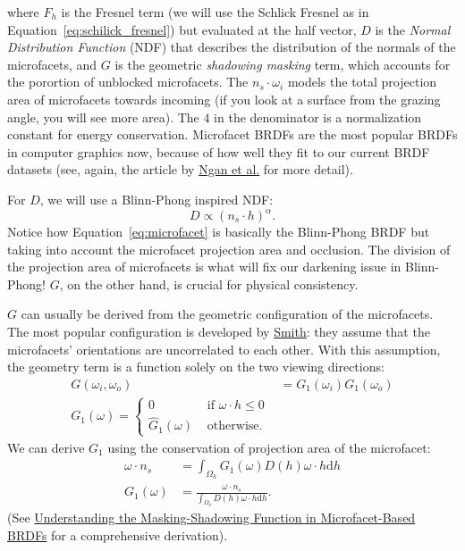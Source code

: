where $F_h$ is the Fresnel term (we will use the Schlick Fresnel as in Equation~\eqref{eq:schilick_fresnel}) but evaluated at the half vector, $D$ is the \emph{Normal Distribution Function} (NDF) that describes the distribution of the normals of the microfacets, and $G$ is the geometric \emph{shadowing masking} term, which accounts for the porortion of unblocked microfacets. The $n_s \cdot \omega_i$ models the total projection area of microfacets towards incoming (if you look at a surface from the grazing angle, you will see more area). The $4$ in the denominator is a normalization constant for energy conservation.
Microfacet BRDFs are the most popular BRDFs in computer graphics now, because of how well they fit to our current BRDF datasets (see, again, the article by \href{http://people.csail.mit.edu/addy/research/brdf/index.html}{Ngan et al.} for more detail).

For $D$, we will use a Blinn-Phong inspired NDF:
\begin{equation}
D \propto \left(n_s \cdot h\right)^{\alpha}.
\label{eq:blinn_NDF}
\end{equation}
Notice how Equation~\eqref{eq:microfacet} is basically the Blinn-Phong BRDF but taking into account the microfacet projection area and occlusion.
The division of the projection area of microfacets is what will fix our darkening issue in Blinn-Phong!
$G$, on the other hand, is crucial for physical consistency.

$G$ can usually be derived from the geometric configuration of the microfacets. The most popular configuration is developed by \href{https://ieeexplore.ieee.org/document/1138991}{Smith}: they assume that the microfacets' orientations are uncorrelated to each other. With this assumption, the geometry term is a function solely on the two viewing directions: 
\begin{equation}
\begin{aligned}
G(\omega_i, \omega_o) &= G_1(\omega_i) G_1(\omega_o) \\
G_1(\omega) = \begin{cases}
0 & \text{ if } \omega \cdot h \leq 0 \\
\hat{G}_1(\omega) & \text{ otherwise.}
\end{cases}
\end{aligned}
\end{equation}
We can derive $G_1$ using the conservation of projection area of the microfacet:
\begin{equation}
\begin{aligned}
\omega \cdot n_s &= \int_{\Omega_h} G_1(\omega) D(h) \omega \cdot h \mathrm{d} h \\
G_1(\omega) &= \frac{\omega \cdot n_s}{\int_{\Omega_h} D(h) \omega \cdot h \mathrm{d} h}. 
\label{eq:smith_g1}
\end{aligned}
\end{equation}
(See \href{https://jcgt.org/published/0003/02/03/}{Understanding the Masking-Shadowing Function in Microfacet-Based BRDFs} for a comprehensive derivation).

